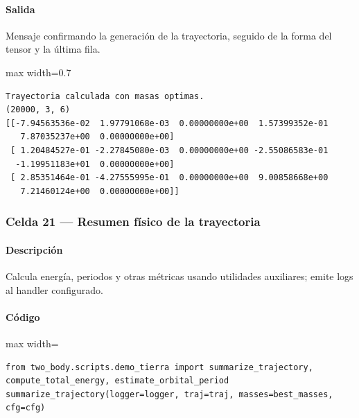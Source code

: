 \paragraph{Salida} Mensaje confirmando la generación de la trayectoria, seguido de la forma del tensor y la última fila.

\begin{listing}[H]
\caption{Ejemplo Salida}
\begin{adjustbox}{max width=0.7\textwidth}
\begin{minipage}{\textwidth}
\begin{verbatim}
Trayectoria calculada con masas optimas.
(20000, 3, 6)
[[-7.94563536e-02  1.97791068e-03  0.00000000e+00  1.57399352e-01
   7.87035237e+00  0.00000000e+00]
 [ 1.20484527e-01 -2.27845080e-03  0.00000000e+00 -2.55086583e-01
  -1.19951183e+01  0.00000000e+00]
 [ 2.85351464e-01 -4.27555995e-01  0.00000000e+00  9.00858668e+00
   7.21460124e+00  0.00000000e+00]]
\end{verbatim}
\end{minipage}
\end{adjustbox}
\end{listing}

\subsubsection*{Celda 21 — Resumen físico de la trayectoria}
\paragraph{Descripción} Calcula energía, periodos y otras métricas usando utilidades auxiliares; emite logs al handler configurado.
\paragraph{Código}
\begin{listing}[H]
\caption{Celda 21: análisis físico de la órbita}
\begin{adjustbox}{max width=\textwidth}
\begin{minipage}{\textwidth}
\begin{verbatim}
from two_body.scripts.demo_tierra import summarize_trajectory, compute_total_energy, estimate_orbital_period
summarize_trajectory(logger=logger, traj=traj, masses=best_masses, cfg=cfg)
\end{verbatim}
\end{minipage}
\end{adjustbox}
\end{listing}
